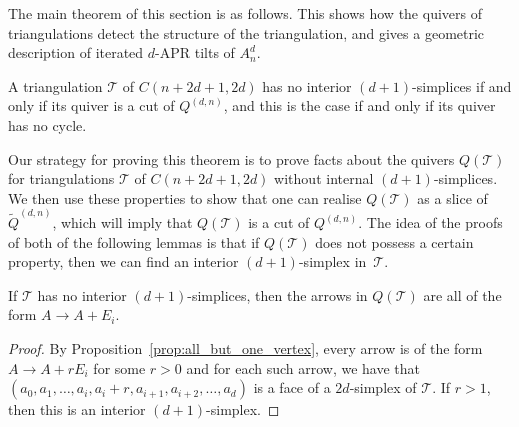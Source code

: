 \documentclass[ALCO,Unicode,published]{cedram}
\newcommand{\ivec}{E_{i}} %
\newcommand{\rvec}{r\ivec} %
\newcommand{\tqdn}{\tilde{Q}^{(d, n)}}
\newcommand{\qdn}{Q^{(d, n)}}
\begin{document}
The main theorem of this section is as follows. This shows how the quivers of triangulations detect the structure of the triangulation, and gives a geometric description of iterated $d$-APR tilts of $A_{n}^{d}$.

\begin{theorem}\label{thm:interior}
A triangulation $\mathcal{T}$ of $C(n + 2d + 1, 2d)$ has no interior $(d+1)$-simplices if and only if its quiver is a cut of $\qdn$, and this is the case if and only if its quiver has no cycle.
\end{theorem}

Our strategy for proving this theorem is to prove facts about the quivers $Q(\mathcal{T})$ for triangulations $\mathcal{T}$ of $C(n + 2d + 1, 2d)$ without internal $(d + 1)$-simplices. We then use these properties to show that one can realise $Q(\mathcal{T})$ as a slice of $\tqdn$, which will imply that $Q(\mathcal{T})$ is a cut of $\qdn$. The idea of the proofs of both of the following lemmas is that if $Q(\mathcal{T})$ does not possess a certain property, then we can find an interior $(d + 1)$-simplex in~$\mathcal{T}$.

\begin{lemma}\label{lem:single-step-arrows}
If $\mathcal{T}$ has no interior $(d+1)$-simplices, then the arrows in $Q(\mathcal{T})$ are all of the form $A \rightarrow A + E_{i}$.
\end{lemma}
\begin{proof}
By Proposition~\ref{prop:all_but_one_vertex}, every arrow is of the form $A \rightarrow A + \rvec$ for some $r>0$ and for each such arrow, we have that $(a_{0}, a_{1}, \dots, a_{i}, a_{i} + r, a_{i+1}, a_{i + 2}, \dots, a_{d})$ is a face of a $2d$-simplex of $\mathcal{T}$. If $r>1$, then this is an interior $(d+1)$-simplex.
\end{proof}
\end{document}
